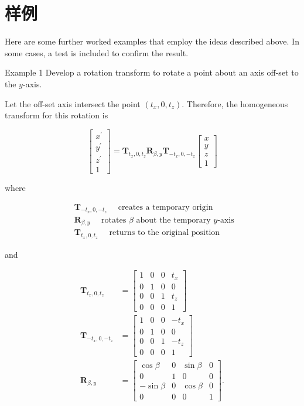 \section{样例}
Here are some further worked examples that employ the ideas described above. In some cases, a test is included to confirm the result.

Example 1 Develop a rotation transform to rotate a point about an axis off-set to the $y$-axis.

Let the off-set axis intersect the point $\left(t_{x}, 0, t_{z}\right)$. Therefore, the homogeneous transform for this rotation is

$$
\left[\begin{array}{c}
x^{\prime} \\
y^{\prime} \\
z^{\prime} \\
1
\end{array}\right]=\mathbf{T}_{t_{x}, 0, t_{z}} \mathbf{R}_{\beta, y} \mathbf{T}_{-t_{x}, 0,-t_{z}}\left[\begin{array}{c}
x \\
y \\
z \\
1
\end{array}\right]
$$

where

$$
\begin{aligned}
& \mathbf{T}_{-t_{x}, 0,-t_{z}} \quad \text { creates a temporary origin } \\
& \mathbf{R}_{\beta, y} \quad \text { rotates } \beta \text { about the temporary } y \text {-axis } \\
& \mathbf{T}_{t_{x}, 0, t_{z}} \quad \text { returns to the original position }
\end{aligned}
$$

and

$$
\begin{aligned}
\mathbf{T}_{t_{x}, 0, t_{z}} & =\left[\begin{array}{llll}
1 & 0 & 0 & t_{x} \\
0 & 1 & 0 & 0 \\
0 & 0 & 1 & t_{z} \\
0 & 0 & 0 & 1
\end{array}\right] \\
\mathbf{T}_{-t_{x}, 0,-t_{z}} & =\left[\begin{array}{cccc}
1 & 0 & 0 & -t_{x} \\
0 & 1 & 0 & 0 \\
0 & 0 & 1 & -t_{z} \\
0 & 0 & 0 & 1
\end{array}\right] \\
\mathbf{R}_{\beta, y} & =\left[\begin{array}{cccc}
\cos \beta & 0 & \sin \beta & 0 \\
0 & 1 & 0 & 0 \\
-\sin \beta & 0 & \cos \beta & 0 \\
0 & 0 & 0 & 1
\end{array}\right] .
\end{aligned}
$$

